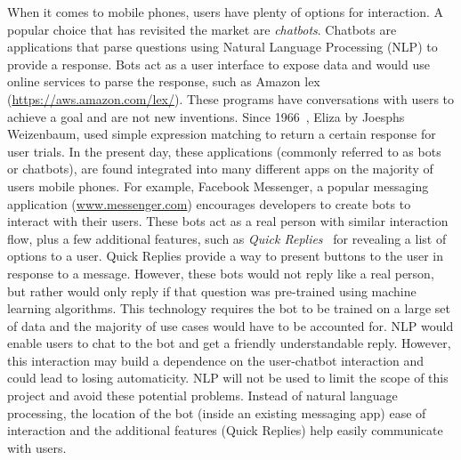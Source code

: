 When it comes to mobile phones, users have plenty of options for interaction. A popular choice that has revisited the market are \textit{chatbots}. Chatbots are applications that parse questions using Natural Language Processing (NLP) to provide a response. Bots act as a user interface to expose data and would use online services to parse the response, such as Amazon lex (\url{https://aws.amazon.com/lex/}). These programs have conversations with users to achieve a goal and are not new inventions. Since 1966~\cite{article_eliza}, Eliza by Joesphs Weizenbaum, used simple expression matching to return a certain response for user trials. In the present day, these applications (commonly referred to as bots or chatbots), are found integrated into many different apps on the majority of users mobile phones. For example, Facebook Messenger, a popular messaging application (\url{www.messenger.com}) encourages developers to create bots to interact with their users. These bots act as a real person with similar interaction flow, plus a few additional features, such as \textit{Quick Replies}~\cite{doc_fb_quick_replies} for revealing a list of options to a user. Quick Replies provide a way to present buttons to the user in response to a message. However, these bots would not reply like a real person, but rather would only reply if that question was pre-trained using machine learning algorithms. This technology requires the bot to be trained on a large set of data and the majority of use cases would have to be accounted for.
NLP would enable users to chat to the bot and get a friendly understandable reply. However, this interaction may build a dependence on the user-chatbot interaction and could lead to losing automaticity. NLP will not be used to limit the scope of this project and avoid these potential problems.
Instead of natural language processing, the location of the bot (inside an existing messaging app) ease of interaction and the additional features (Quick Replies) help easily communicate with users.



